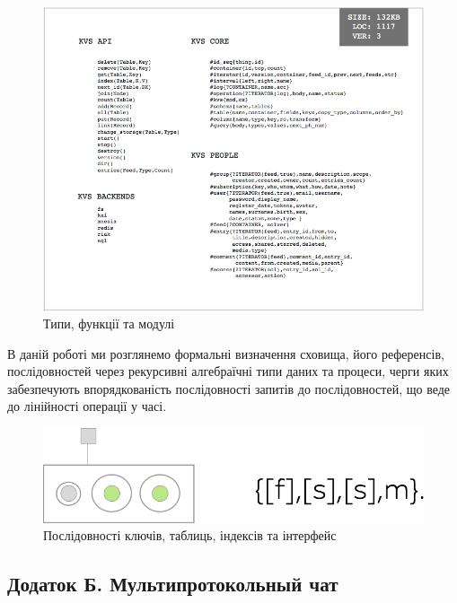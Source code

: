 \documentclass[11pt,oneside]{article}
\begin{document}
\begin{figure}[h!]
\centering
\includegraphics[scale=0.4]{img/exe-kvs-api}
\caption{Типи, функції та модулі}
\end{figure}

В даній роботі ми розглянемо формальні визначення сховища, його референсів, послідовностей через рекурсивні
алгебраїчні типи даних та процеси, черги яких забезпечують впорядкованість послідовності
запитів до послідовностей, що веде до лінійності операції у часі.

\begin{figure}[h!]
\centering
\includegraphics[scale=0.4]{img/exe-kvs}
\caption{Послідовності ключів, таблиць, індексів та інтерфейс}
\end{figure}

\newpage
\subsection*{Додаток Б. Мультипротокольный чат}
\end{document}

